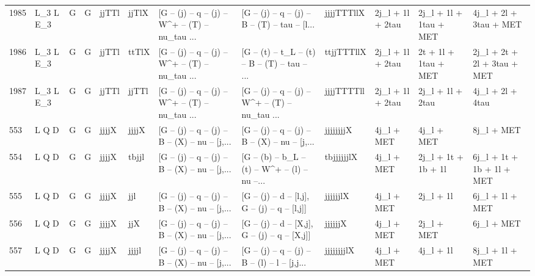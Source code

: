 \begin{tabular}{llllllllllll}
1985 &    L\_3 L E\_3 &     G &     G &       jjTTl &       jjTlX &  [G -- (j) -- q -- (j) -- W\textasciicircum + -- (T) -- nu\_tau ... &  [G -- (j) -- q -- (j) -- B -- (T) -- tau -- [l... &  jjjjTTTllX &         2j\_l + 1l + 2tau &   2j\_l + 1l + 1tau + MET &             4j\_l + 2l + 3tau + MET \\
1986 &    L\_3 L E\_3 &     G &     G &       jjTTl &       ttTlX &  [G -- (j) -- q -- (j) -- W\textasciicircum + -- (T) -- nu\_tau ... &  [G -- (t) -- t\_L -- (t) -- B -- (T) -- tau -- ... &  ttjjTTTllX &         2j\_l + 1l + 2tau &     2t + 1l + 1tau + MET &        2j\_l + 2t + 2l + 3tau + MET \\
1987 &    L\_3 L E\_3 &     G &     G &       jjTTl &       jjTTl &  [G -- (j) -- q -- (j) -- W\textasciicircum + -- (T) -- nu\_tau ... &  [G -- (j) -- q -- (j) -- W\textasciicircum + -- (T) -- nu\_tau ... &  jjjjTTTTll &         2j\_l + 1l + 2tau &         2j\_l + 1l + 2tau &                   4j\_l + 2l + 4tau \\
553  &        L Q D &     G &     G &       jjjjX &       jjjjX &  [G -- (j) -- q -- (j) -- B -- (X) -- nu -- [j,... &  [G -- (j) -- q -- (j) -- B -- (X) -- nu -- [j,... &   jjjjjjjjX &               4j\_l + MET &               4j\_l + MET &                         8j\_l + MET \\
554  &        L Q D &     G &     G &       jjjjX &       tbjjl &  [G -- (j) -- q -- (j) -- B -- (X) -- nu -- [j,... &  [G -- (b) -- b\_L -- (t) -- W\textasciicircum + -- (l) -- nu --... &  tbjjjjjjlX &               4j\_l + MET &      2j\_l + 1t + 1b + 1l &          6j\_l + 1t + 1b + 1l + MET \\
555  &        L Q D &     G &     G &       jjjjX &         jjl &  [G -- (j) -- q -- (j) -- B -- (X) -- nu -- [j,... &   [G -- (j) -- d -- [l,j], G -- (j) -- q -- [l,j]] &    jjjjjjlX &               4j\_l + MET &                2j\_l + 1l &                    6j\_l + 1l + MET \\
556  &        L Q D &     G &     G &       jjjjX &         jjX &  [G -- (j) -- q -- (j) -- B -- (X) -- nu -- [j,... &   [G -- (j) -- d -- [X,j], G -- (j) -- q -- [X,j]] &     jjjjjjX &               4j\_l + MET &               2j\_l + MET &                         6j\_l + MET \\
557  &        L Q D &     G &     G &       jjjjX &       jjjjl &  [G -- (j) -- q -- (j) -- B -- (X) -- nu -- [j,... &  [G -- (j) -- q -- (j) -- B -- (l) -- l -- [j,j... &  jjjjjjjjlX &               4j\_l + MET &                4j\_l + 1l &                    8j\_l + 1l + MET \\

\end{tabular}
